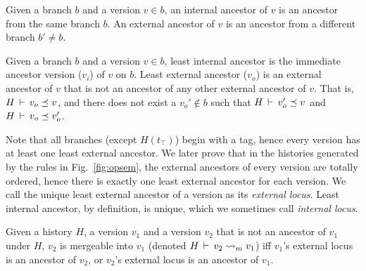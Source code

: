 

\begin{definition} 
Given a branch $b$ and a version $v\in b$, an internal ancestor of $v$
is an ancestor from the same branch $b$. An external ancestor of $v$
is an ancestor from a different branch $b'\neq b$. 
\end{definition}

\begin{definition} 
Given a branch $b$ and a version $v\in b$, least internal ancestor is
the immediate ancestor version ($v_i$) of $v$ on $b$. Least external
ancestor ($v_o$) is an external ancestor of $v$ that is not an
ancestor of any other external ancestor of $v$. That is,
$H\,\vdash\,v_o \preceq v$, and there does not exist a $v_o' \not\in
b$ such that $H\,\vdash\,v_o' \preceq v$ and $H\,\vdash\,v_o \preceq
v_o'$. 
\end{definition}

Note that all branches (except $H(t_{\top})$) begin with a 
tag, hence every version has at least one least external ancestor. We
later prove that in the histories generated by the rules in
Fig.~\ref{fig:opsem}, the external ancestors of every version are
totally ordered, hence there is exactly one least external ancestor
for each version. We call the unique least external ancestor of a
version as its \emph{external locus}. Least internal ancestor, by
definition, is unique, which we sometimes call \emph{internal locus}.

\begin{definition} 
Given a history $H$, a version $v_1$ and a version $v_2$ that is not
an ancestor of $v_1$ under $H$, $v_2$ is mergeable into $v_1$ (denoted
$H\,\vdash\,v_2 \rightsquigarrow_m v_1$) iff $v_1$'s external locus is an
ancestor of $v_2$, or $v_2$'s external locus is an ancestor of $v_1$.
\end{definition}

